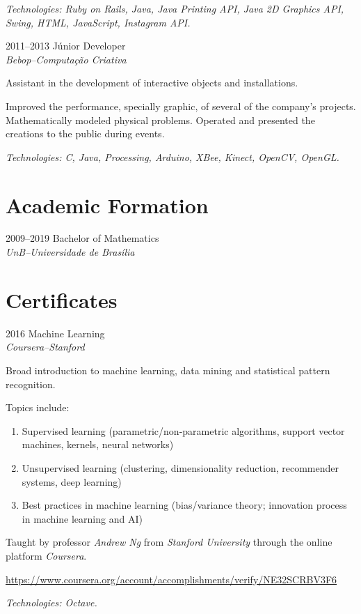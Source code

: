 \documentclass[a4paper]{simplecv}
\begin{document}
\begin{topic}
	{\em\scriptsize Technologies: Ruby on Rails, Java, Java Printing API,
	Java 2D Graphics API, Swing, HTML, JavaScript, Instagram API.}

\item[2011--2013] Júnior Developer\\
	{\em\small Bebop--Computação Criativa}

	Assistant in the development of interactive objects and installations.

	Improved the performance, specially graphic, of several of the company's
	projects. Mathematically modeled physical problems. Operated and
	presented the creations to the public during events.

	{\em\scriptsize Technologies: C, Java, Processing, Arduino, XBee,
	Kinect, OpenCV, OpenGL.}
\end{topic}

\section{Academic Formation}

\begin{topic}
\item[2009--2019] Bachelor of Mathematics\\
	{\em\small UnB--Universidade de Brasília}

\end{topic}

\section{Certificates}

\begin{topic}
\item[2016] Machine Learning\\
	{\em\small Coursera--Stanford}

	Broad introduction to machine learning, data mining and statistical
	pattern recognition.

	Topics include:
	\begin{enumerate}
		\item Supervised learning (parametric/non-parametric
			algorithms, support vector machines, kernels, neural
			networks)

		\item Unsupervised learning (clustering, dimensionality
			reduction, recommender systems, deep learning)

		\item Best practices in machine learning (bias/variance theory;
			innovation process in machine learning and AI)
	\end{enumerate}

	Taught by professor \emph{Andrew Ng} from \emph{Stanford University}
	through the online platform \emph{Coursera}.

	{\scriptsize\url{https://www.coursera.org/account/accomplishments/verify/NE32SCRBV3F6}}

	{\em\scriptsize Technologies: Octave.}
\end{topic}
\end{document}
